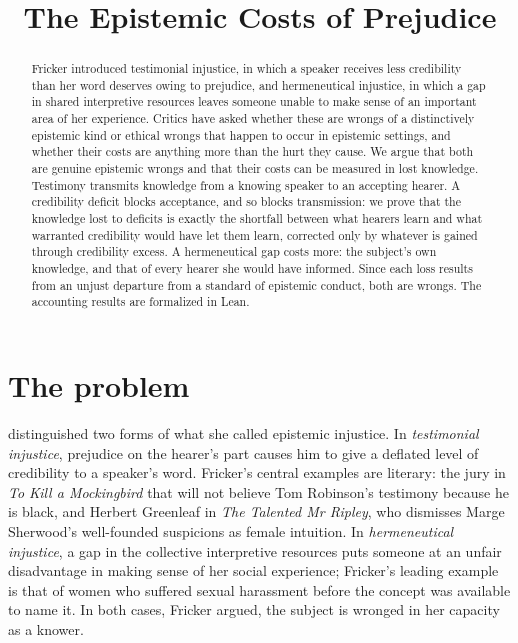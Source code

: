 \documentclass{situationist-preprint}
\title{The Epistemic Costs of Prejudice}
\begin{document}
\maketitle

\begin{abstract}
Fricker introduced testimonial injustice, in which a speaker receives less credibility than her word deserves owing to prejudice, and hermeneutical injustice, in which a gap in shared interpretive resources leaves someone unable to make sense of an important area of her experience. Critics have asked whether these are wrongs of a distinctively epistemic kind or ethical wrongs that happen to occur in epistemic settings, and whether their costs are anything more than the hurt they cause. We argue that both are genuine epistemic wrongs and that their costs can be measured in lost knowledge. Testimony transmits knowledge from a knowing speaker to an accepting hearer. A credibility deficit blocks acceptance, and so blocks transmission: we prove that the knowledge lost to deficits is exactly the shortfall between what hearers learn and what warranted credibility would have let them learn, corrected only by whatever is gained through credibility excess. A hermeneutical gap costs more: the subject's own knowledge, and that of every hearer she would have informed. Since each loss results from an unjust departure from a standard of epistemic conduct, both are wrongs. The accounting results are formalized in Lean.
\end{abstract}

\section{The problem}

\citet{Fricker2007} distinguished two forms of what she called epistemic injustice. In \emph{testimonial injustice}, prejudice on the hearer's part causes him to give a deflated level of credibility to a speaker's word. Fricker's central examples are literary: the jury in \emph{To Kill a Mockingbird} that will not believe Tom Robinson's testimony because he is black, and Herbert Greenleaf in \emph{The Talented Mr Ripley}, who dismisses Marge Sherwood's well-founded suspicions as female intuition. In \emph{hermeneutical injustice}, a gap in the collective interpretive resources puts someone at an unfair disadvantage in making sense of her social experience; Fricker's leading example is that of women who suffered sexual harassment before the concept was available to name it. In both cases, Fricker argued, the subject is wronged in her capacity as a knower.
\end{document}
